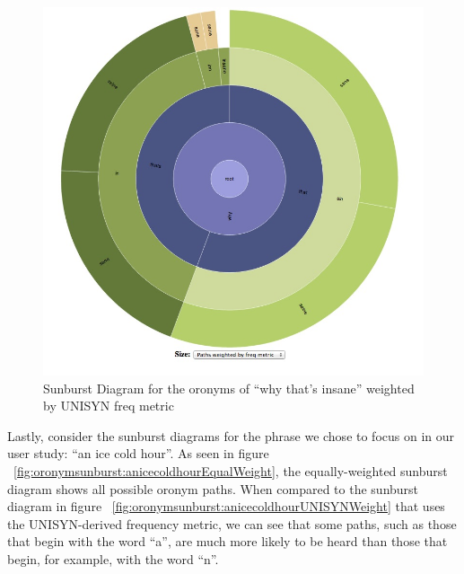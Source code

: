 \begin{figure}
\includegraphics[width=150mm]{whyThatsInsane_UNISYN.jpg}
\captionfonts
\caption[Sunburst Diagram for the oronyms of ``why that's insane'' weighted by UNISYN freq metric]{Sunburst Diagram for the oronyms of ``why that's insane'' weighted by UNISYN freq metric }
\label{fig:oronymsunburst:whyThatsInsaneUNISYNWeight}
\end{figure}


Lastly, consider the sunburst diagrams for the phrase we chose to focus on in our user study: ``an ice cold hour''.  As seen in figure ~\ref{fig:oronymsunburst:anicecoldhourEqualWeight}, the equally-weighted sunburst diagram shows all possible oronym paths. When compared to the sunburst diagram in figure ~\ref{fig:oronymsunburst:anicecoldhourUNISYNWeight} that uses the UNISYN-derived frequency metric, we can see that some paths, such as those that begin with the word ``a'', are much more likely to be heard than those that begin, for example, with the word ``n''. 


